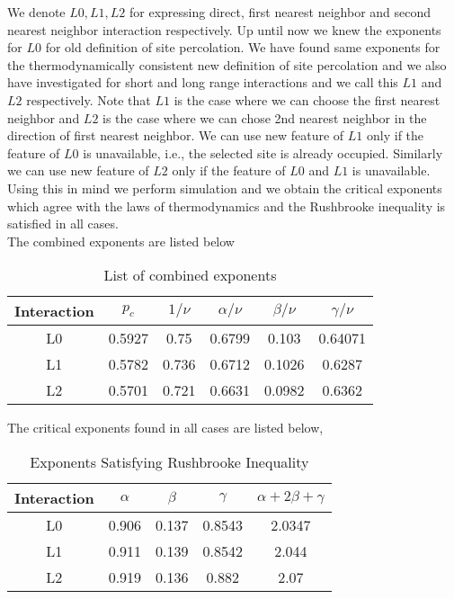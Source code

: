 We denote $L0,L1,L2$ for expressing direct, first nearest neighbor and second nearest neighbor interaction respectively. Up until now we knew the exponents for $L0$ for old definition of site percolation. We have found same exponents for the thermodynamically consistent new definition of site percolation and we also have investigated for short and long range interactions and we call this $L1$ and $L2$ respectively. Note that $L1$ is the case where we can choose the first nearest neighbor and $L2$ is the case where we can chose 2nd nearest neighbor in the direction of first nearest neighbor. We can use new feature of $L1$ only if the feature of $L0$ is unavailable, i.e., the selected site is already occupied. Similarly we can use new feature of $L2$ only if the feature of $L0$ and $L1$ is unavailable. Using this in mind we perform simulation and we obtain the critical exponents which agree with the laws of thermodynamics and the Rushbrooke inequality is satisfied in all cases.\\
The combined exponents are listed below\\
\begin{table}
\centering
\begin{tabular}{|c|c|c|c|c|c|}
	\hline
	Interaction & $p_c$ & $1/\nu$ & $\alpha/\nu$ & $\beta/\nu$ & $\gamma/\nu$ \\ \hline
	L0 & 0.5927 & 0.75  & 0.6799 & 0.103  & 0.64071  \\ \hline
	L1 & 0.5782 & 0.736 & 0.6712 & 0.1026 & 0.6287  \\ \hline
	L2 & 0.5701 & 0.721 & 0.6631 & 0.0982 & 0.6362  \\ \hline
\end{tabular}
\caption{List of combined exponents}
\label{tab:exponents-combined}
\end{table}
The critical exponents found in all cases are listed below,\\
\begin{table}
\centering
\begin{tabular}{|c|c|c|c|c|}
	\hline
	Interaction & $\alpha$ & $\beta$ & $\gamma$ & $\alpha+2\beta+\gamma$ \\ \hline
	L0  & 0.906 & 0.137 & 0.8543 & 2.0347   \\ \hline
	L1  & 0.911 & 0.139 & 0.8542 & 2.044   \\ \hline
	L2  & 0.919 & 0.136 & 0.882  & 2.07    \\ \hline
\end{tabular}
\caption{Exponents Satisfying Rushbrooke Inequality}
\label{tab:rushbrooke}
\end{table}

